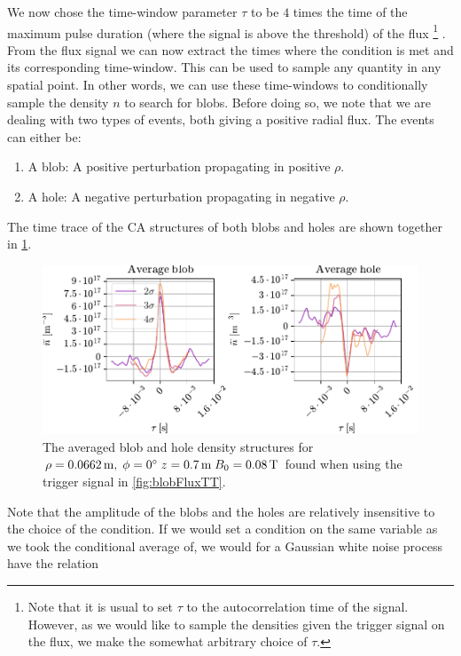 We now chose the time-window parameter $\tau$ to be $4$ times the time of the maximum pulse duration (where the signal is above the threshold) of the flux%
\footnote{Note that it is usual to set $\tau$ to the autocorrelation time of the signal.
    However, as we would like to sample the densities given the trigger signal on the flux, we make the somewhat arbitrary choice of $\tau$.
}%
.
From the flux signal we can now extract the times where the condition is met and its corresponding time-window.
This can be used to sample any quantity in any spatial point.
In other words, we can use these time-windows to conditionally sample the density $n$ to search for blobs.
Before doing so, we note that we are dealing with two types of events, both giving a positive radial flux.
The events can either be:
%
\begin{enumerate}[noitemsep]
    \item A blob: A positive perturbation propagating in positive $\rho$.
    \item A hole: A negative perturbation propagating in negative $\rho$.
\end{enumerate}
%
The time trace of the CA structures of both blobs and holes are shown together in \cref{fig:blobAndHoleTT}.
%
\begin{figure}[htb]
    \begin{center}
        \includegraphics{fig/results/blobs/blobsAndHoles-B0_008Tweak}
    \end{center}
    \caption{The averaged blob and hole density structures for $\rho=0.0662\, \text{m},\;\phi=0^{\circ}\;z=0.7\, \text{m}\;B_0=0.08\, \text{T}$ found when using the trigger signal in \cref{fig:blobFluxTT}.}
    \label{fig:blobAndHoleTT}
\end{figure}
%
Note that the amplitude of the blobs and the holes are relatively insensitive to the choice of the condition.
If we would set a condition on the same variable as we took the conditional average of, we would for a Gaussian white noise process have the relation \cite{Edwards1983}
